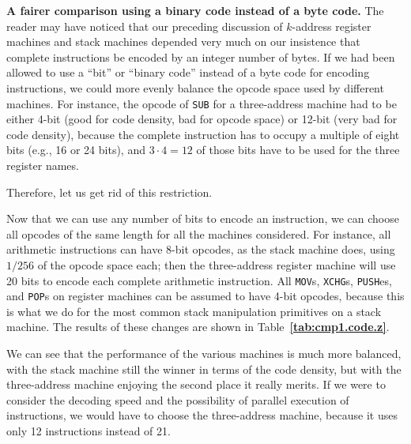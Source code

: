\documentclass[12pt,oneside]{article}
\def\makepoint#1{\medbreak\noindent{\bf #1.\ }}
\def\nxsubpoint{\refstepcounter{subsubsection}%
  \smallbreak\makepoint{\thesubsubsection}}
\def\refpoint#1{{\rm\textbf{\ref{#1}}}}
\let\ptref=\refpoint
\def\emb#1{\textbf{#1.}}
\begin{document}
\nxsubpoint\label{sp:cmp1.fair}
\emb{A fairer comparison using a binary code instead of a byte code}
The reader may have noticed that our preceding discussion of $k$-address register machines and stack machines depended very much on our insistence that complete instructions be encoded by an integer number of bytes. If we had been allowed to use a ``bit'' or ``binary code'' instead of a byte code for encoding instructions, we could more evenly balance the opcode space used by different machines. For instance, the opcode of {\tt SUB} for a three-address machine had to be either 4-bit (good for code density, bad for opcode space) or 12-bit (very bad for code density), because the complete instruction has to occupy a multiple of eight bits (e.g., 16 or 24 bits), and $3\cdot 4=12$ of those bits have to be used for the three register names.

Therefore, let us get rid of this restriction.

Now that we can use any number of bits to encode an instruction, we can choose all opcodes of the same length for all the machines considered. For instance, all arithmetic instructions can have 8-bit opcodes, as the stack machine does, using $1/256$ of the opcode space each; then the three-address register machine will use 20 bits to encode each complete arithmetic instruction. All {\tt MOV}s, {\tt XCHG}s, {\tt PUSH}es, and {\tt POP}s on register machines can be assumed to have 4-bit opcodes, because this is what we do for the most common stack manipulation primitives on a stack machine. The results of these changes are shown in Table~\ptref{tab:cmp1.code.z}.

We can see that the performance of the various machines is much more balanced, with the stack machine still the winner in terms of the code density, but with the three-address machine enjoying the second place it really merits. If we were to consider the decoding speed and the possibility of parallel execution of instructions, we would have to choose the three-address machine, because it uses only 12 instructions instead of 21.
\end{document}
